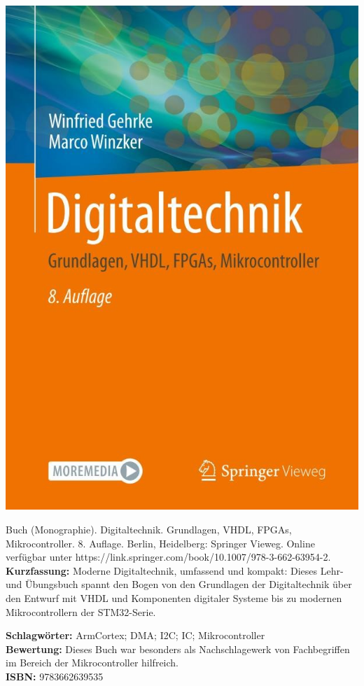 {
\begin{minipage}{0.38\textwidth}
	\includegraphics[width=\linewidth]{images/Gehrke.jpg}
\end{minipage}
\hfill
\begin{minipage}{0.6\textwidth}
Buch (Monographie). Digitaltechnik. Grundlagen, VHDL, FPGAs, Mikrocontroller.
8. Auflage. Berlin, Heidelberg: Springer Vieweg. Online verfügbar unter https://link.springer.com/book/10.1007/978-3-662-63954-2.
\\ \textbf{Kurzfassung:}
Moderne Digitaltechnik, umfassend und kompakt: Dieses Lehr- und Übungsbuch spannt den Bogen von den Grundlagen der Digitaltechnik über den Entwurf mit VHDL und Komponenten digitaler Systeme bis zu modernen Mikrocontrollern der STM32-Serie.	
\end{minipage}
\textbf{Schlagwörter:}
ArmCortex; DMA; I2C; IC; Mikrocontroller
\\ \textbf{Bewertung:}
Dieses Buch war besonders als Nachschlagewerk von Fachbegriffen im Bereich der Mikrocontroller hilfreich.
\\ \textbf{ISBN:}
9783662639535
}

